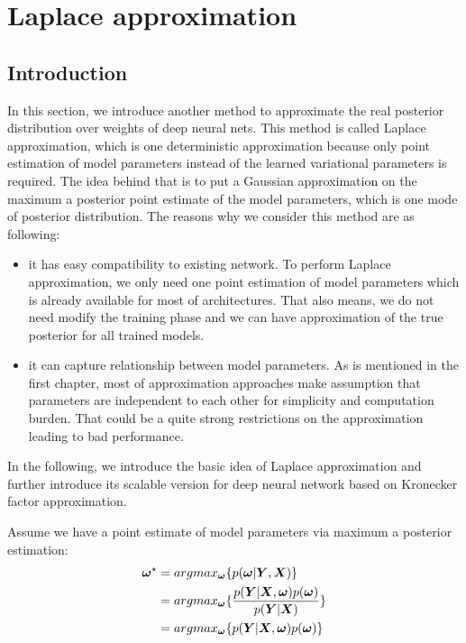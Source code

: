\newpage
\section{Laplace approximation}
\subsection{Introduction}
In this section, we introduce another method to approximate the real posterior distribution over weights of deep neural nets. This method is called Laplace approximation\cite{bishop2006pattern}, which is one deterministic approximation because only point estimation of model parameters instead of the learned variational parameters is required. The idea behind that is to put a Gaussian approximation on the maximum a posterior point estimate of the model parameters, which is one mode of posterior distribution. The reasons why we consider this method are as following:
\begin{itemize}
	\item it has easy compatibility to existing network. To perform Laplace approximation, we only need one point estimation of model parameters which is already available for most of architectures. That also means, we do not need modify the training phase and we can have approximation of the true posterior for all trained models.
	\item it can capture relationship between model parameters. As is mentioned in the first chapter, most of approximation approaches make assumption that parameters are independent to each other for simplicity and computation burden. That could be a quite strong restrictions on the approximation leading to bad performance.
\end{itemize}

In the following, we introduce the basic idea of Laplace approximation and further introduce its scalable version for deep neural network based on Kronecker factor approximation.

Assume we have a point estimate of model parameters via maximum a posterior estimation:
\begin{equation}
\begin{aligned} \label{point estimate}
\boldsymbol \omega^\star &= argmax_{\boldsymbol \omega}\{p(\boldsymbol \omega|\boldsymbol Y,\boldsymbol X)\} \\
&= argmax_{\boldsymbol \omega}\{\frac{p(\boldsymbol Y|\boldsymbol X, \boldsymbol \omega) p(\boldsymbol \omega)}{p(\boldsymbol Y | \boldsymbol X)}\} \\
&= argmax_{\boldsymbol \omega}\{p(\boldsymbol Y|\boldsymbol X, \boldsymbol \omega) p(\boldsymbol \omega)\}
\end{aligned}
\end{equation}


